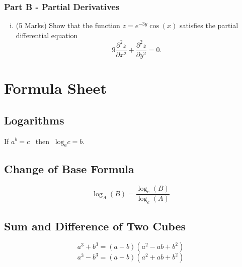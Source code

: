 ﻿ \documentclass[a4paper,12pt]{article}
\begin{document}
\bigskip
\subsubsection*{Part B - Partial Derivatives}
\begin{enumerate}[(i)]
	
	\item (5 Marks)
	Show that the function $z=e^{-3y}\cos(x)$ satisfies the partial differential equation
	\[ 9\frac{\partial^2 z}{\partial x^2} + \frac{\partial^2 z}{\partial y^2} = 0. \]
\end{enumerate}
%
%	
%
%
%

\newpage
	\section*{Formula Sheet}
	
\subsection*{Logarithms}
If $a^b = c$ \, then \, $\mbox{log}_a c = b$.



\subsection*{Change of Base Formula}

\[ \log_A(B) = \frac{ \log_e(B) }{ \log_e(A) }  \]
	\subsection*{Sum and Difference of Two Cubes}
	\[ a^3 + b^3 = (a-b)(a^2 - ab + b^2)\]
	\[ a^3 - b^3 = (a-b)(a^2 + ab + b^2)\]
	
\end{document}
